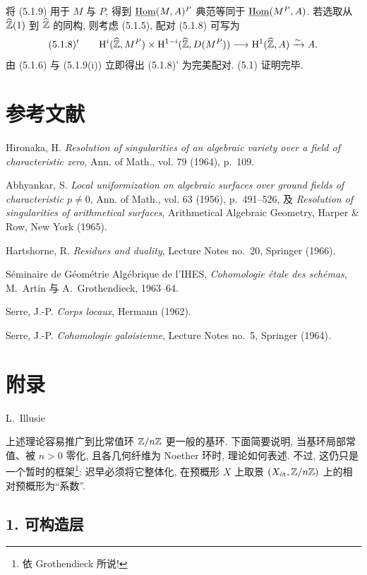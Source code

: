 将 (5.1.9) 用于 $M$ 与 $P$, 得到 $\underline{\operatorname{Hom}}(M,A)^P$ 典范等同于 $\underline{\operatorname{Hom}}(M^P,A)$. 若选取从 $\widehat{\mathbb Z}(1)$ 到 $\widehat{\mathbb Z}$ 的同构, 则考虑 (5.1.5), 配对 (5.1.8) 可写为
\[
(5.1.8)'\qquad \mathrm{H}^i(\widehat{\mathbb Z},M^P)\times\mathrm{H}^{1-i}(\widehat{\mathbb Z},D(M^P))\longrightarrow\mathrm{H}^1(\widehat{\mathbb Z},A)\xrightarrow{\sim}A.
\]
由 (5.1.6) 与 (5.1.9(i)) 立即得出 (5.1.8)' 为完美配对. (5.1) 证明完毕.

\section*{参考文献}

\begin{description}[leftmargin=2.5cm,style=nextline]
\item[{[2]}] Hironaka, H. \emph{Resolution of singularities of an algebraic variety over a field of characteristic zero}, Ann. of Math., vol. 79 (1964), p.~109.
\item[{[1]}] Abhyankar, S. \emph{Local uniformization on algebraic surfaces over ground fields of characteristic $p\ne0$}, Ann. of Math., vol. 63 (1956), p.~491--526, 及 \emph{Resolution of singularities of arithmetical surfaces}, Arithmetical Algebraic Geometry, Harper \& Row, New York (1965).
\item[{[H]}] Hartshorne, R. \emph{Residues and duality}, Lecture Notes no.~20, Springer (1966).
\item[{[SGAA]}] Séminaire de Géométrie Algébrique de l'IHES, \emph{Cohomologie étale des schémas}, M.~Artin 与 A.~Grothendieck, 1963--64.
\item[{[CL]}] Serre, J.-P. \emph{Corps locaux}, Hermann (1962).
\item[{[CG]}] Serre, J.-P. \emph{Cohomologie galoisienne}, Lecture Notes no.~5, Springer (1964).
\end{description}

\section*{附录}
\begin{center}
L.~Illusie
\end{center}

上述理论容易推广到比常值环 $\mathbb Z/n\mathbb Z$ 更一般的基环. 下面简要说明, 当基环局部常值、被 $n>0$ 零化, 且各几何纤维为 Noether 环时, 理论如何表述. 不过, 这仍只是一个暂时的框架\footnote{依 Grothendieck 所说!}: 迟早必须将它整体化, 在预概形 $X$ 上取景 $(X_{\mathrm{\acute et}},\mathbb Z/n\mathbb Z)$ 上的相对预概形为“系数”.

\subsection*{1. 可构造层}


